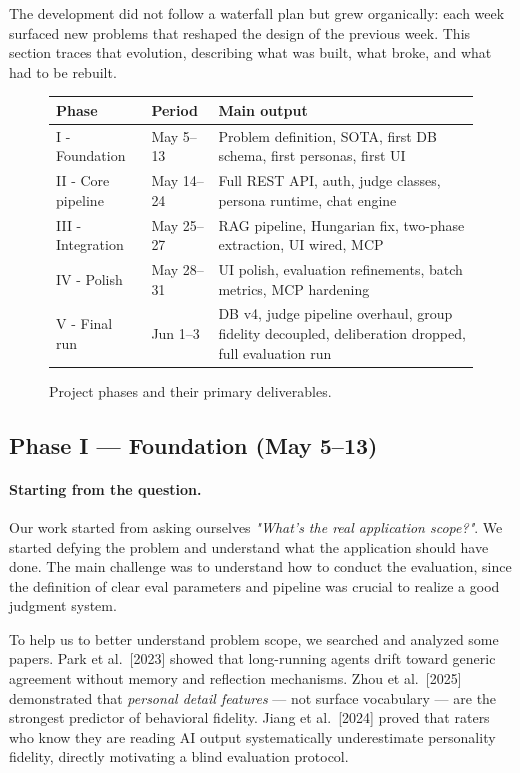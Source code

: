 \documentclass[12pt,a4paper]{article}
\begin{document}
The development did not follow a waterfall plan but grew organically:
each week surfaced new problems that reshaped the design of the previous week. This section traces that evolution, describing what was built, what broke, and what had to be rebuilt.

\begin{figure}[ht]
\centering
\small
\begin{tabular}{@{}>{\raggedright\arraybackslash}p{2.8cm}>{\raggedright\arraybackslash}p{2.0cm}>{\raggedright\arraybackslash}p{9.6cm}@{}}
\toprule
\textbf{Phase} & \textbf{Period} & \textbf{Main output} \\
\midrule
I - Foundation   & May 5--13  & Problem definition, SOTA, first DB schema, first personas, first UI \\
II - Core pipeline & May 14--24 & Full REST API, auth, judge classes, persona runtime, chat engine \\
III - Integration  & May 25--27 & RAG pipeline, Hungarian fix, two-phase extraction, UI wired, MCP \\
IV - Polish        & May 28--31 & UI polish, evaluation refinements, batch metrics, MCP hardening \\
V - Final run      & Jun 1--3   & DB v4, judge pipeline overhaul, group fidelity decoupled, deliberation dropped, full evaluation run \\
\bottomrule
\end{tabular}
\normalsize
\caption{Project phases and their primary deliverables.}
\end{figure}

\subsection{Phase I --- Foundation (May 5--13)}

\paragraph{Starting from the question.}
Our work started from asking ourselves  \textit{"What's the real application scope?"}. We started defying the problem and understand what the application should have done. The main challenge was to understand how to conduct the evaluation, since the definition of clear eval parameters and pipeline was crucial to realize a good judgment system.

To help us to better understand problem scope, we searched and analyzed some papers. Park et al.\ [2023] showed that long-running agents drift toward
generic agreement without memory and reflection mechanisms. Zhou et al.\ [2025] demonstrated that
\emph{personal detail features} --- not surface vocabulary --- are the strongest predictor of
behavioral fidelity. Jiang et al.\ [2024] proved that raters who know they are reading AI output
systematically underestimate personality fidelity, directly motivating a blind evaluation
protocol.
\end{document}
